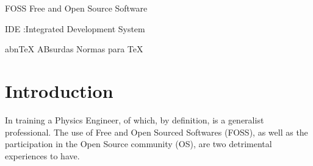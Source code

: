 \documentclass[
12pt,				%
openright,			%
oneside,			%
a4paper,			%
brazil,				%
english,			%
]{abntex2}
\begin{document}

\begin{siglas}
  \item[FOSS] Free and Open Source Software  
  \item[IDE]:Integrated Development System 
  \item[abnTeX] ABsurdas Normas para TeX
\end{siglas}


\tableofcontents*
\cleardoublepage



\textual


\chapter[Introduction]{Introduction}

In training a Physics Engineer, of which, by definition, is a generalist professional. The use of Free and Open Sourced Softwares (FOSS), as well as the participation in the Open Source community (OS), are two detrimental experiences to have.
\end{document}
